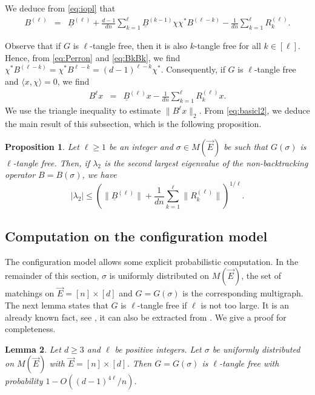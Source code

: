 \documentclass[11pt]{article}
\newtheorem{lemma}{Lemma}
\newtheorem{proposition}[lemma]{Proposition}
\newcommand{\PAR}[1]{{{\left(#1\right)}}} %
\newcommand{\uB}{{\underline B}}
\newcommand{\1}{1\!\!{\sf I}}\newcommand{\IND}{\1}
\begin{document}
We deduce from \eqref{eq:iopl} that \begin{eqnarray*}
B^{(\ell)}   &= & \uB^{(\ell)}   +    \frac {d-1} {dn}  \sum_{k = 1} ^{\ell}  \uB^{(k-1)} \chi \chi^* B^{(\ell - k)}  -   \frac 1 {dn}     \sum_{k = 1}^{\ell} R^{(\ell)}_{k} .
\end{eqnarray*}

Observe that if $G$ is $\ell$-tangle free, then it is also $k$-tangle free for all $k \in[ \ell]$. Hence, from \eqref{eq:Perron} and \eqref{eq:BkBk}, we find $\chi^* B^{(\ell - k)}  = \chi^* B^{\ell - k}  =  (d-1)^{\ell -k} \chi^*$. Consequently, if $G$ is $\ell$-tangle free  and $\langle x , \chi \rangle = 0$,  we find
\begin{eqnarray}
 B^{\ell} x &   = &   \uB^{(\ell)} x    -  \frac 1{d n}   \sum_{k = 1}^\ell  R^{(\ell)}_{k} x.\label{eq:decompBkx}
\end{eqnarray}
We use the triangle inequality to estimate $\| B^{\ell} x \|_2$. From \eqref{eq:basicl2}, we deduce the main result of this subsection, which is the following
proposition. 

\begin{proposition}\label{le:decompBl}
Let $\ell \geq 1$ be an integer and $\sigma \in M(\vec E)$ be such that $G(\sigma)$ is $\ell$-tangle free. Then, if $\lambda_2$ is the second largest eigenvalue of the non-backtracking operator $B = B(\sigma)$, we have
$$
|\lambda_2 | \leq  \PAR{\|  \uB^{(\ell)} \|   +  \frac 1{d n}   \sum_{k = 1}^\ell \| R^{(\ell)}_{k} \|} ^{1/\ell}.$$
\end{proposition}



\subsection{Computation on the configuration model}

\label{subsec:CM}
The configuration model allows some explicit probabilistic computation.  In the remainder of this section, $\sigma$ is uniformly distributed on $M(\vec E)$, the set of matchings on $\vec E = [n] \times [d]$ and $G = G(\sigma)$ is the corresponding multigraph.  The next lemma states that $G$ is $\ell$-tangle free if $\ell$ is not too large. It is an already  known fact, see \cite[Lemma 2.1]{MR2667423}, it can also be extracted from \cite{MR2097332}. We give a proof for completeness.


\begin{lemma}\label{le:tangle}
Let $d \geq 3$ and $\ell$ be positive integers. Let $\sigma$ be uniformly distributed on $M(\vec E)$ with $\vec E = [n] \times [d]$. Then $G = G(\sigma)$ is $\ell$-tangle free with probability $1 - O ((d-1)^{4\ell} / n)$.
\end{lemma}
\end{document}
